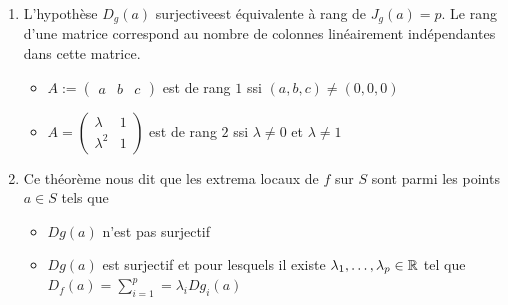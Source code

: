 \begin{remarque}
    \begin{enumerate}
        \item L'hypothèse \og $D_g(a)$ surjective\fg  est équivalente à \og rang de $J_g(a) = p$\fg. Le rang d'une matrice correspond au nombre de colonnes linéairement indépendantes dans cette matrice.
        \begin{itemize}
            \item $A:=\begin{pmatrix}
                a & b & c
            \end{pmatrix}$ est de rang $1$ ssi $(a,b,c)\ne (0,0,0)$
            \item $A = \begin{pmatrix}
                \lambda & 1 \\
                \lambda^2 & 1
            \end{pmatrix}$ est de rang $2$ ssi $\lambda\ne 0$ et $\lambda\ne 1$
        \end{itemize}
        
        \item Ce théorème nous dit que les extrema locaux de $f$ sur $S$ sont parmi les points $a\in S$ tels que \begin{itemize}
            \item $Dg(a)$ n'est pas surjectif
            \item $Dg(a)$ est surjectif et pour lesquels il existe $\lambda_1,\dots,\lambda_p\in \mathbb{R}$ tel que $D_f(a) = \sum_{i = 1}^p = \lambda_iDg_i(a)$            
        \end{itemize}
    \end{enumerate}
\end{remarque}
